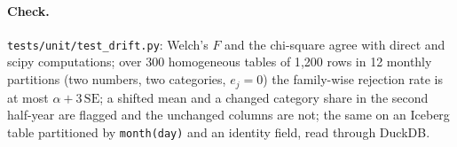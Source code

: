 \paragraph{Check.} \texttt{tests/unit/test\_drift.py}: Welch's $F$ and the chi-square agree with direct and scipy computations; over 300 homogeneous tables of 1{,}200 rows in 12 monthly partitions (two numbers, two categories, $e_j=0$) the family-wise rejection rate is at most $\alpha+3\,\mathrm{SE}$; a shifted mean and a changed category share in the second half-year are flagged and the unchanged columns are not; the same on an Iceberg table partitioned by \texttt{month(day)} and an identity field, read through DuckDB.

\setcounter{proposition}{\value{savedproprt}}
